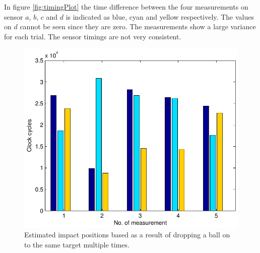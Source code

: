 In figure \ref{fig:timingPlot} the time difference between the four measurements on sensor $a$, $b$, $c$ and $d$ is indicated as blue, cyan and yellow respectively.
The values on $d$ cannot be seen since they are zero.
The measurements show a large variance for each trial. The sensor timings are not very consistent.

\begin{figure}[htb]
	\centering
	\includegraphics[width=.8\textwidth]{figures/clockCycles30deg.pdf}
	\caption{Estimated impact positions based as a result of dropping a ball on to the same target multiple times.}
	\label{fig:clockCycles30deg}
\end{figure}

